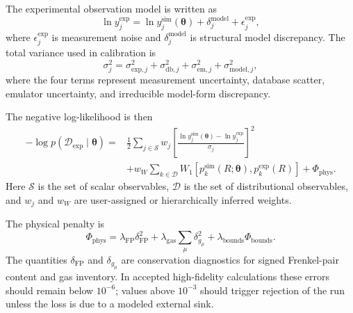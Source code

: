 The experimental observation model is written as
\begin{equation}
    \ln y_j^{\mathrm{exp}}
    =
    \ln y_j^{\mathrm{sim}}(\boldsymbol{\theta})
    +
    \delta_j^{\mathrm{model}}
    +
    \epsilon_j^{\mathrm{exp}},
    \label{eq:dt_obs_model}
\end{equation}
where $\epsilon_j^{\mathrm{exp}}$ is measurement noise and
$\delta_j^{\mathrm{model}}$ is structural model discrepancy.  The total variance
used in calibration is
\begin{equation}
    \sigma_j^2
    =
    \sigma_{\mathrm{exp},j}^2
    +
    \sigma_{\mathrm{db},j}^2
    +
    \sigma_{\mathrm{em},j}^2
    +
    \sigma_{\mathrm{model},j}^2,
    \label{eq:dt_uncertainty_sum}
\end{equation}
where the four terms represent measurement uncertainty, database scatter,
emulator uncertainty, and irreducible model-form discrepancy.

The negative log-likelihood is then
\begin{equation}
\begin{split}
    -\log p(\mathcal{D}_{\mathrm{exp}}\mid\boldsymbol{\theta})
    =&
    \frac{1}{2}
    \sum_{j\in\mathcal{S}}
    w_j
    \left[
      \frac{
      \ln y_j^{\mathrm{sim}}(\boldsymbol{\theta})
      -
      \ln y_j^{\mathrm{exp}}
      }{
      \sigma_j
      }
    \right]^2
    \\
    &+
    w_W
    \sum_{k\in\mathcal{D}}
    W_1\!\left[
      p_k^{\mathrm{sim}}(R;\boldsymbol{\theta}),
      p_k^{\mathrm{exp}}(R)
    \right]
    +
    \Phi_{\mathrm{phys}} .
\end{split}
\label{eq:dt_neg_log_likelihood}
\end{equation}
Here $\mathcal{S}$ is the set of scalar observables, $\mathcal{D}$ is the set
of distributional observables, and $w_j$ and $w_W$ are user-assigned or
hierarchically inferred weights.

The physical penalty is
\begin{equation}
    \Phi_{\mathrm{phys}}
    =
    \lambda_{\mathrm{FP}}\delta_{\mathrm{FP}}^2
    +
    \lambda_{\mathrm{gas}}\sum_\mu \delta_{g_\mu}^2
    +
    \lambda_{\mathrm{bounds}}\Phi_{\mathrm{bounds}} .
    \label{eq:dt_physical_penalty}
\end{equation}
The quantities $\delta_{\mathrm{FP}}$ and $\delta_{g_\mu}$ are conservation
diagnostics for signed Frenkel-pair content and gas inventory.  In accepted
high-fidelity calculations these errors should remain below $10^{-6}$; values
above $10^{-3}$ should trigger rejection of the run unless the loss is due to a
modeled external sink.


